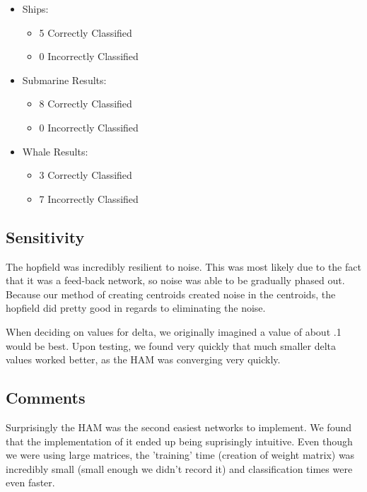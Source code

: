 \documentclass{article}
\begin{document}
\begin{itemize}
    \item Ships:
    \begin{itemize}
        \item 5 Correctly Classified
        \item 0 Incorrectly Classified
        \end{itemize}
    \item Submarine Results:
    \begin{itemize}
        \item 8 Correctly Classified
        \item 0 Incorrectly Classified
        \end{itemize}
    \item Whale Results:
    \begin{itemize}
        \item 3 Correctly Classified
        \item 7 Incorrectly Classified
        \end{itemize}
\end{itemize}        

\subsection{Sensitivity}
The hopfield was incredibly resilient to noise. This was most likely due to the fact that it was a feed-back network, so noise was able to be gradually phased out. Because our method of creating centroids created noise in the centroids, the hopfield did pretty good in regards to eliminating the noise.

When deciding on values for delta, we originally imagined a value of about .1 would be best. Upon testing, we found very quickly that much smaller delta values worked better, as the HAM was converging very quickly.

\subsection{Comments}
Surprisingly the HAM was the second easiest networks to implement. We found that the implementation of it ended up being suprisingly intuitive. Even though we were using large matrices, the 'training' time (creation of weight matrix) was incredibly small (small enough we didn't record it) and classification times were even faster.
\end{document}

